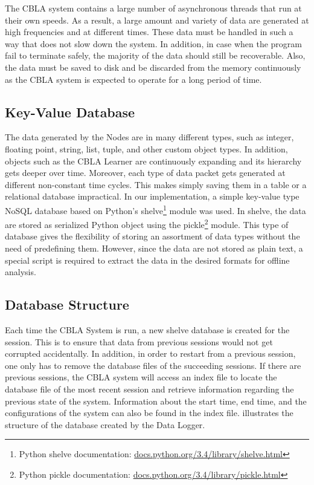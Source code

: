 The CBLA system contains a large number of asynchronous threads that run at their own speeds. As a result, a large amount and variety of data are generated at high frequencies and at different times. These data must be handled in such a way that does not slow down the system. In addition, in case when the program fail to terminate safely, the majority of the data should still be recoverable. Also, the data must be saved to disk and be discarded from the memory continuously as the CBLA system is expected to operate for a long period of time.

\subsection{Key-Value Database}
 
The data generated by the Nodes are in many different types, such as integer, floating point, string, list, tuple, and other custom object types. In addition, objects such as the CBLA Learner are continuously expanding and its hierarchy gets deeper over time. Moreover, each type of data packet gets generated at different non-constant time cycles. This makes simply saving them in a table or a relational database impractical. In our implementation, a simple key-value type NoSQL database based on Python's shelve\footnote{Python shelve documentation: \url{docs.python.org/3.4/library/shelve.html}} module was used. In shelve, the data are stored as serialized Python object using the pickle\footnote{Python pickle documentation: \url{docs.python.org/3.4/library/pickle.html}} module. This type of database gives the flexibility of storing an assortment of data types without the need of predefining them. However, since the data are not stored as plain text, a special script is required to extract the data in the desired formats for offline analysis. 

\subsection{Database Structure}

Each time the CBLA System is run, a new shelve database is created for the session. This is to ensure that data from previous sessions would not get corrupted accidentally. In addition, in order to restart from a previous session, one only has to remove the database files of the succeeding sessions. If there are previous sessions, the CBLA system will access an index file to locate the database file of the most recent session and retrieve information regarding the previous state of the system. Information about the start time, end time, and the configurations of the system can also be found in the index file.  illustrates the structure of the database created by the Data Logger. 

